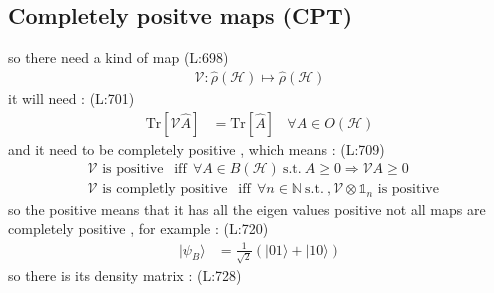 \subsection{Completely positve maps  (CPT)}
 so there need a kind of map
(L:698)
\begin{equation}
\begin{split}
\mathcal{V }:\hat{\rho }(\mathcal{H })\mapsto \hat{\rho }(\mathcal{H })\end{split}
\end{equation}
 it will need :
(L:701)
\begin{equation}
\begin{split}
\text{Tr}\left[\mathcal{V }\hat{A }\right]&=\text{Tr}\left[\hat{A }\right]\ \ \ \ \forall A \in O (\mathcal{H })\end{split}
\end{equation}
 and it need to be completely positive , which means :
(L:709)
\begin{equation}
\begin{split}
&\mathcal{V }\text{\ is\ positive\ }\ \ \text{iff}\ \ \forall A \in B (\mathcal{H })\ \text{s.t.}\ A \geq 0\Rightarrow \mathcal{V }A \geq 0\\
&\mathcal{V }\text{\ is\ completly\ positive\ }\ \ \text{iff}\ \ \forall n \in \mathds{N }\ \text{s.t.}\ ,\mathcal{V }\otimes \mathds{1}_{n }\text{\ is\ positive\ }\end{split}
\end{equation}
 so the positive means that it has all the eigen values positive
 not all maps are completely positive , for example : 
(L:720)
\begin{equation}
\begin{split}
|\psi _{B }\rangle &=\frac{1}{\sqrt{2}}(|01\rangle +|10\rangle )\end{split}
\end{equation}
 so there is its density matrix : 
(L:728)
